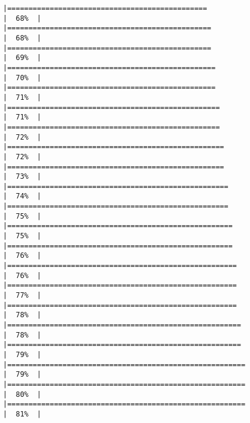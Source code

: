 \documentclass[
]{article}
\begin{document}
\begin{verbatim}
|===============================================                       |  68%  |                                                                              |================================================                      |  68%  |                                                                              |================================================                      |  69%  |                                                                              |=================================================                     |  70%  |                                                                              |=================================================                     |  71%  |                                                                              |==================================================                    |  71%  |                                                                              |==================================================                    |  72%  |                                                                              |===================================================                   |  72%  |                                                                              |===================================================                   |  73%  |                                                                              |====================================================                  |  74%  |                                                                              |====================================================                  |  75%  |                                                                              |=====================================================                 |  75%  |                                                                              |=====================================================                 |  76%  |                                                                              |======================================================                |  76%  |                                                                              |======================================================                |  77%  |                                                                              |======================================================                |  78%  |                                                                              |=======================================================               |  78%  |                                                                              |=======================================================               |  79%  |                                                                              |========================================================              |  79%  |                                                                              |========================================================              |  80%  |                                                                              |========================================================              |  81%  |                                                                              
\end{verbatim}
\end{document}
